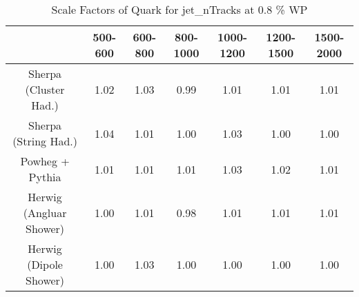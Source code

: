 \begin{table}
\centering
\caption{Scale Factors of Quark for jet_nTracks at 0.8 \% WP}
\label{tab:SF_MC_jet_nTracks_0.8_Quark}
\begin{tabular}{ccccccc}
\toprule
{} &  500-600 &  600-800 &  800-1000 &  1000-1200 &  1200-1500 &  1500-2000 \\
\midrule
Sherpa (Cluster Had.)   &     1.02 &     1.03 &      0.99 &       1.01 &       1.01 &       1.01 \\
Sherpa (String Had.)    &     1.04 &     1.01 &      1.00 &       1.03 &       1.00 &       1.00 \\
Powheg + Pythia         &     1.01 &     1.01 &      1.01 &       1.03 &       1.02 &       1.01 \\
Herwig (Angluar Shower) &     1.00 &     1.01 &      0.98 &       1.01 &       1.01 &       1.01 \\
Herwig (Dipole Shower)  &     1.00 &     1.03 &      1.00 &       1.00 &       1.00 &       1.00 \\
\bottomrule
\end{tabular}
\end{table}
